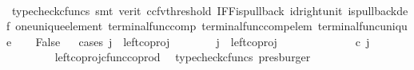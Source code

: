 \begin{isabellebody}
\ \ \ \ \isamarkupfalse%
\ {\isacharparenleft}{\kern0pt}typecheck{\isacharunderscore}{\kern0pt}cfuncs{\isacharcomma}{\kern0pt}\ smt\ {\isacharparenleft}{\kern0pt}verit{\isacharcomma}{\kern0pt}\ ccfv{\isacharunderscore}{\kern0pt}threshold{\isacharparenright}{\kern0pt}\ IFF{\isacharunderscore}{\kern0pt}is{\isacharunderscore}{\kern0pt}pullback\ id{\isacharunderscore}{\kern0pt}right{\isacharunderscore}{\kern0pt}unit{}\ is{\isacharunderscore}{\kern0pt}pullback{\isacharunderscore}{\kern0pt}def\ one{\isacharunderscore}{\kern0pt}unique{\isacharunderscore}{\kern0pt}element\ terminal{\isacharunderscore}{\kern0pt}func{\isacharunderscore}{\kern0pt}comp\ terminal{\isacharunderscore}{\kern0pt}func{\isacharunderscore}{\kern0pt}comp{\isacharunderscore}{\kern0pt}elem\ terminal{\isacharunderscore}{\kern0pt}func{\isacharunderscore}{\kern0pt}unique{\isacharparenright}{\kern0pt}\isanewline
\ \ \isamarkupfalse%
\ False\isanewline
\ \ \isamarkupfalse%
{\isacharparenleft}{\kern0pt}cases\ {\isachardoublequoteopen}j\ {\isacharequal}{\kern0pt}\ left{\isacharunderscore}{\kern0pt}coproj\ {\isasymone}\ {\isasymone}{\isachardoublequoteclose}{\isacharparenright}{\kern0pt}\isanewline
\ \ \ \ \isamarkupfalse%
\ {\isachardoublequoteopen}j\ {\isacharequal}{\kern0pt}\ left{\isacharunderscore}{\kern0pt}coproj\ {\isasymone}\ {\isasymone}{\isachardoublequoteclose}\isanewline
\ \ \ \ \isamarkupfalse%
\ \isamarkupfalse%
\ {\isachardoublequoteopen}{\isacharparenleft}{\kern0pt}{\isasymlangle}{\isasymt}{\isacharcomma}{\kern0pt}\ {\isasymt}{\isasymrangle}\ {\isasymamalg}{\isasymlangle}{\isasymf}{\isacharcomma}{\kern0pt}\ {\isasymf}{\isasymrangle}{\isacharparenright}{\kern0pt}\ {\isasymcirc}\isactrlsub c\ j\ \ {\isacharequal}{\kern0pt}\ {\isasymlangle}{\isasymt}{\isacharcomma}{\kern0pt}\ {\isasymt}{\isasymrangle}{\isachardoublequoteclose}\isanewline
\ \ \ \ \ \ \isamarkupfalse%
\ \ left{\isacharunderscore}{\kern0pt}coproj{\isacharunderscore}{\kern0pt}cfunc{\isacharunderscore}{\kern0pt}coprod\ \isamarkupfalse%
\ {\isacharparenleft}{\kern0pt}typecheck{\isacharunderscore}{\kern0pt}cfuncs{\isacharcomma}{\kern0pt}\ presburger{\isacharparenright}{\kern0pt}\isanewline
\ \ \ \ \isamarkupfalse%
\ \isamarkupfalse%
\ {\isachardoublequoteopen}{\isasymlangle}{\isasymf}{\isacharcomma}{\kern0pt}{\isasymt}{\isasymrangle}\ {\isacharequal}{\kern0pt}\ {\isasymlangle}{\isasymt}{\isacharcomma}{\kern0pt}{\isasymt}{\isasymrangle}{\isachardoublequoteclose}\isanewline

\end{isabellebody}
